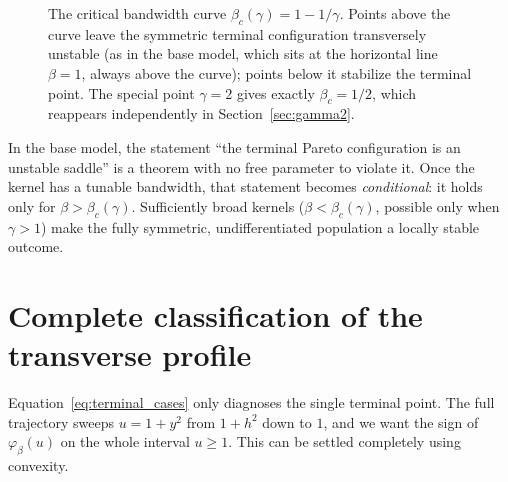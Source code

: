 \documentclass[11pt,a4paper]{article}
\theoremstyle{plain}
\theoremstyle{definition}
\theoremstyle{remark}
\newcommand{\bw}{\beta}
\newcommand{\phib}{\varphi_{\bw}}
\newcommand{\bwc}{\beta_c}
\begin{document}
\begin{figure}[H]
\centering
{}
\caption{The critical bandwidth curve $\bwc(\gamma)=1-1/\gamma$. Points above
the curve leave the symmetric terminal configuration transversely unstable
(as in the base model, which sits at the horizontal line $\bw=1$, always
above the curve); points below it stabilize the terminal point. The
special point $\gamma=2$ gives exactly $\bwc=1/2$, which reappears
independently in Section~\ref{sec:gamma2}.}
\label{fig:beta_c}
\end{figure}

\begin{warningbox}
In the base model, the statement ``the terminal Pareto configuration is an
unstable saddle'' is a theorem with no free parameter to violate it. Once
the kernel has a tunable bandwidth, that statement becomes
\emph{conditional}: it holds only for $\bw>\bwc(\gamma)$. Sufficiently broad
kernels ($\bw<\bwc(\gamma)$, possible only when $\gamma>1$) make the fully
symmetric, undifferentiated population a locally stable outcome.
\end{warningbox}

\section{Complete classification of the transverse profile}
\label{sec:classification}

Equation~\eqref{eq:terminal_cases} only diagnoses the single terminal point.
The full trajectory sweeps $u=1+y^2$ from $1+h^2$ down to $1$, and we want
the sign of $\phib(u)$ on the whole interval $u\ge1$. This can be settled
completely using convexity.
\end{document}
